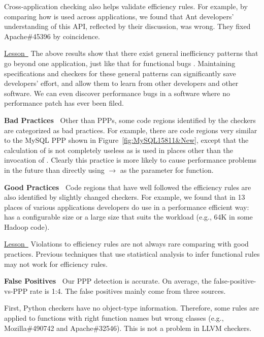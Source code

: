 Cross-application checking also helps validate efficiency rules.
For example, by comparing how 
is used across applications, we found that Ant developers'
understanding of this API, reflected by their discussion, 
was wrong. They fixed Apache\#45396 by coincidence.

\underline{Lesson\ } 
The above results show that there exist general inefficiency patterns that
go beyond one application, just like that for functional
bugs \citep{billpugh}. 
Maintaining specifications and checkers for these general patterns can 
significantly save developers' effort, and allow them
to learn from other developers and other software. 
We can even discover performance bugs in a software where no
performance patch has ever been filed.

{\bf Bad Practices\ } 
Other than PPPs, some code regions identified by the 
checkers are categorized as bad practices.
For example, there are code regions very similar to
the MySQL PPP shown in Figure~\ref{fig:MySQL15811&New}, except that the calculation of
 is not completely useless as  is used in places other than 
the invocation of .
Clearly this practice is more likely to cause performance problems
in the future than directly using
$\rightarrow$ as the parameter
for  function.

{\bf Good Practices\ }
Code regions that have well followed the efficiency rules are also identified
by slightly changed checkers.
For example, we found that in 13 places of various applications 
developers do use 
 in a performance efficient
way:  has a configurable size or 
a large size that suits the workload (e.g., 64K in some Hadoop code).

\underline{Lesson\ } Violations to efficiency rules are not 
always rare comparing with good practices. 
Previous techniques that use statistical analysis to
infer functional rules \citep{PRMiner05,engler01bugs} 
may not work for efficiency rules.

{\bf False Positives\ }
Our PPP detection is accurate. 
On average, the false-positive-vs-PPP rate is 1:4.
The false positives mainly come from three sources.

First, Python checkers have no object-type information.
Therefore, some rules are applied to functions
with right function names but wrong classes
(e.g., Mozilla\#490742 and 
Apache\#32546). This is not a problem in LLVM checkers.

